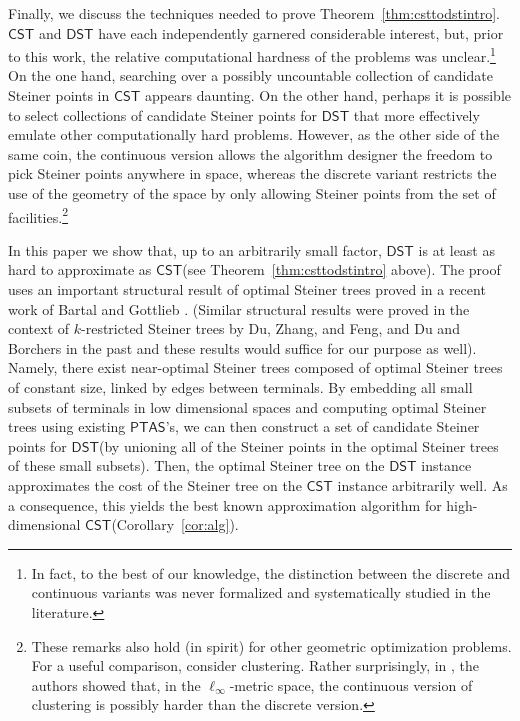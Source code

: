 \documentclass{article}\providecommand{\DeclareRedundantLanguages}[2]{}\usepackage[a4paper,margin=20mm]{geometry}
\newcommand{\1}{\textbf{1}}
\newcommand{\cst}{$\mathsf{CST}$\xspace}
\newcommand{\dst}{$\mathsf{DST}$\xspace}
\newcommand{\ptas}{$\mathsf{PTAS}$\xspace}
\begin{document}
Finally, we discuss the techniques needed to prove Theorem~\ref{thm:csttodstintro}. 
\cst and \dst have each independently garnered considerable interest, but, prior to this work, the relative computational hardness of the problems was unclear.\footnote{In fact, to the best of our knowledge, the distinction between the discrete and continuous variants was never formalized and systematically studied in the literature.} On the one hand, searching over a possibly uncountable collection of candidate Steiner points in \cst appears daunting. On the other hand, perhaps it is possible to select collections of candidate Steiner points for \dst that more effectively emulate other computationally hard problems. However, as the other side of the same coin, the continuous version allows the algorithm designer the freedom to pick Steiner points anywhere in space, whereas the discrete variant restricts the use of the  geometry of the space by only allowing Steiner points from the set of facilities.\footnote{These remarks also hold (in spirit) for other geometric optimization problems. For a useful comparison, consider clustering. Rather surprisingly, in \cite{CKL21}, the authors showed that, in the $\ell_\infty$-metric space, the continuous version of clustering is possibly harder than the discrete version. }

In this paper we show that, up to an arbitrarily small factor, \dst is at least as hard to approximate as \cst (see Theorem~\ref{thm:csttodstintro} above). The proof uses an important structural result of optimal Steiner trees proved in a recent work of Bartal and Gottlieb \cite{Bartal_Gottlieb_2021}. (Similar structural results were proved in the context of $k$-restricted Steiner trees by Du, Zhang, and Feng, and Du and Borchers \cite{DuZhangFeng91, Borchers97} in the past and these results would suffice for our purpose as well). Namely, there exist near-optimal Steiner trees composed of optimal Steiner trees of constant size, linked by edges between terminals. By embedding all small subsets of terminals in low dimensional spaces and computing optimal Steiner trees using existing \ptas's, we can then construct a set of candidate Steiner points for \dst (by unioning all of the Steiner points in the optimal Steiner trees of these small subsets). Then, the optimal Steiner tree on the \dst instance approximates the cost of the Steiner tree on the \cst instance arbitrarily well. As a consequence, this yields the best known approximation algorithm for high-dimensional \cst (Corollary~\ref{cor:alg}). 
\end{document}
